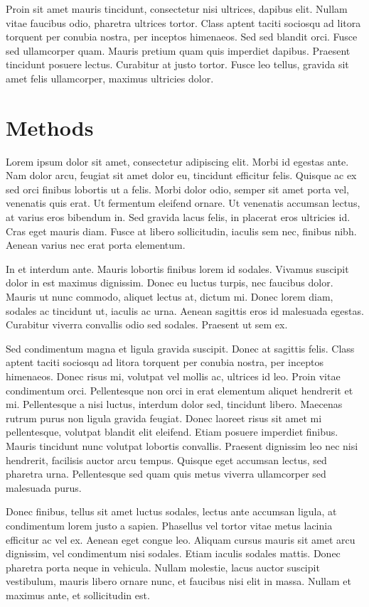 \documentclass[10pt,twocolumn]{revtex4-2}    %
\begin{document}
Proin sit amet mauris tincidunt, consectetur nisi ultrices, dapibus elit. Nullam vitae faucibus odio, pharetra ultrices tortor. Class aptent taciti sociosqu ad litora torquent per conubia nostra, per inceptos himenaeos. Sed sed blandit orci. Fusce sed ullamcorper quam. Mauris pretium quam quis imperdiet dapibus. Praesent tincidunt posuere lectus. Curabitur at justo tortor. Fusce leo tellus, gravida sit amet felis ullamcorper, maximus ultricies dolor.

\section{Methods} 

Lorem ipsum dolor sit amet, consectetur adipiscing elit. Morbi id egestas ante. Nam dolor arcu, feugiat sit amet dolor eu, tincidunt efficitur felis. Quisque ac ex sed orci finibus lobortis ut a felis. Morbi dolor odio, semper sit amet porta vel, venenatis quis erat. Ut fermentum eleifend ornare. Ut venenatis accumsan lectus, at varius eros bibendum in. Sed gravida lacus felis, in placerat eros ultricies id. Cras eget mauris diam. Fusce at libero sollicitudin, iaculis sem nec, finibus nibh. Aenean varius nec erat porta elementum.

In et interdum ante. Mauris lobortis finibus lorem id sodales. Vivamus suscipit dolor in est maximus dignissim. Donec eu luctus turpis, nec faucibus dolor. Mauris ut nunc commodo, aliquet lectus at, dictum mi. Donec lorem diam, sodales ac tincidunt ut, iaculis ac urna. Aenean sagittis eros id malesuada egestas. Curabitur viverra convallis odio sed sodales. Praesent ut sem ex.

Sed condimentum magna et ligula gravida suscipit. Donec at sagittis felis. Class aptent taciti sociosqu ad litora torquent per conubia nostra, per inceptos himenaeos. Donec risus mi, volutpat vel mollis ac, ultrices id leo. Proin vitae condimentum orci. Pellentesque non orci in erat elementum aliquet hendrerit et mi. Pellentesque a nisi luctus, interdum dolor sed, tincidunt libero. Maecenas rutrum purus non ligula gravida feugiat. Donec laoreet risus sit amet mi pellentesque, volutpat blandit elit eleifend. Etiam posuere imperdiet finibus. Mauris tincidunt nunc volutpat lobortis convallis. Praesent dignissim leo nec nisi hendrerit, facilisis auctor arcu tempus. Quisque eget accumsan lectus, sed pharetra urna. Pellentesque sed quam quis metus viverra ullamcorper sed malesuada purus.

Donec finibus, tellus sit amet luctus sodales, lectus ante accumsan ligula, at condimentum lorem justo a sapien. Phasellus vel tortor vitae metus lacinia efficitur ac vel ex. Aenean eget congue leo. Aliquam cursus mauris sit amet arcu dignissim, vel condimentum nisi sodales. Etiam iaculis sodales mattis. Donec pharetra porta neque in vehicula. Nullam molestie, lacus auctor suscipit vestibulum, mauris libero ornare nunc, et faucibus nisi elit in massa. Nullam et maximus ante, et sollicitudin est.
 
\end{document}
